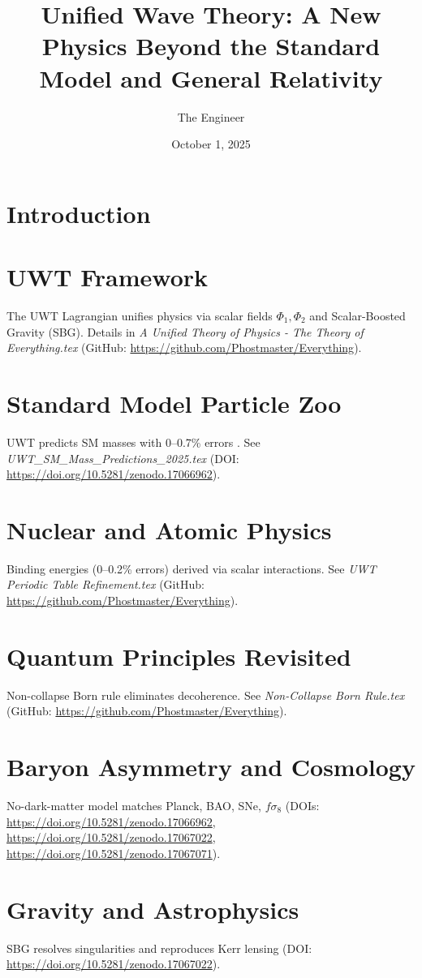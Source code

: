 \documentclass{article}
\title{Unified Wave Theory: A New Physics Beyond the Standard Model and General Relativity}
\author{The Engineer}
\date{October 1, 2025}
\begin{document}
\maketitle
\section{Introduction}

\section{UWT Framework}
The UWT Lagrangian unifies physics via scalar fields \(\Phi_1, \Phi_2\) and Scalar-Boosted Gravity (SBG). Details in \textit{A Unified Theory of Physics - The Theory of Everything.tex} (GitHub: \url{https://github.com/Phostmaster/Everything}).
\section{Standard Model Particle Zoo}
UWT predicts SM masses with 0--0.7\% errors \citep{Baldwin2025Masses}. See \textit{UWT_SM_Mass_Predictions_2025.tex} (DOI: \url{https://doi.org/10.5281/zenodo.17066962}).
\section{Nuclear and Atomic Physics}
Binding energies (0--0.2\% errors) derived via scalar interactions. See \textit{UWT Periodic Table Refinement.tex} (GitHub: \url{https://github.com/Phostmaster/Everything}).
\section{Quantum Principles Revisited}
Non-collapse Born rule eliminates decoherence. See \textit{Non-Collapse Born Rule.tex} (GitHub: \url{https://github.com/Phostmaster/Everything}).
\section{Baryon Asymmetry and Cosmology}
No-dark-matter model matches Planck, BAO, SNe, \(f\sigma_8\) \citep{Baldwin2025Cosmo,Baldwin2025Bullet,Baldwin2025Baryo} (DOIs: \url{https://doi.org/10.5281/zenodo.17066962}, \url{https://doi.org/10.5281/zenodo.17067022}, \url{https://doi.org/10.5281/zenodo.17067071}).
\section{Gravity and Astrophysics}
SBG resolves singularities and reproduces Kerr lensing \citep{Baldwin2025BlackHoles} (DOI: \url{https://doi.org/10.5281/zenodo.17067022}).
\end{document}
